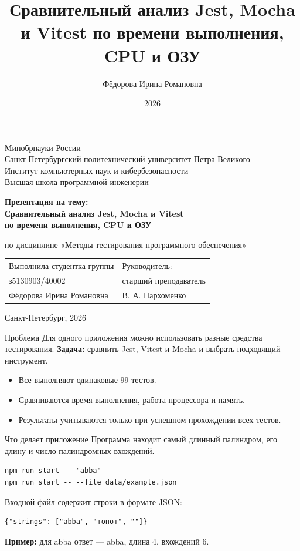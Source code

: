 \documentclass[aspectratio=169,11pt]{beamer}
\title{Сравнительный анализ Jest, Mocha и Vitest по времени выполнения, CPU и ОЗУ}
\author{Фёдорова Ирина Романовна}
\institute{СПбПУ, ИКНК, ВШ ПИ}
\date{2026}
\begin{document}
\begin{frame}[plain]
\centering
{\fontsize{9}{11}\selectfont Минобрнауки России\\
Санкт-Петербургский политехнический университет Петра Великого\\
Институт компьютерных наук и кибербезопасности\\Высшая школа программной инженерии\par}
\vspace{5mm}
{\color{spbblue}\Large\bfseries Презентация на тему:\\Сравнительный анализ Jest, Mocha и Vitest\\по времени выполнения, CPU и ОЗУ\par}
\vspace{3mm}
{\small по дисциплине «Методы тестирования программного обеспечения»\par}
\vspace{5mm}
\begin{tabularx}{.95\textwidth}{XX}
\small Выполнила студентка группы & \small Руководитель:\\
\small з5130903/40002 & \small старший преподаватель\\
\small Фёдорова Ирина Романовна & \small В. А. Пархоменко
\end{tabularx}
\vfill{\small Санкт-Петербург, 2026}
\end{frame}
\begin{frame}{Проблема}
Для одного приложения можно использовать разные средства тестирования.
\vspace{4mm}
\textbf{Задача:} сравнить Jest, Vitest и Mocha и выбрать подходящий инструмент.
\begin{itemize}
\item Все выполняют одинаковые 99 тестов.
\item Сравниваются время выполнения, работа процессора и память.
\item Результаты учитываются только при успешном прохождении всех тестов.
\end{itemize}
\end{frame}

\begin{frame}[fragile]{Что делает приложение}
Программа находит самый длинный палиндром, его длину и число палиндромных вхождений.
\begin{Verbatim}[fontsize=\small]
npm run start -- "abba"
npm run start -- --file data/example.json
\end{Verbatim}
Входной файл содержит строки в формате JSON:
\begin{Verbatim}[fontsize=\small]
{"strings": ["abba", "топот", ""]}
\end{Verbatim}
\textbf{Пример:} для abba ответ --- abba, длина 4, вхождений 6.
\end{frame}
\end{document}
